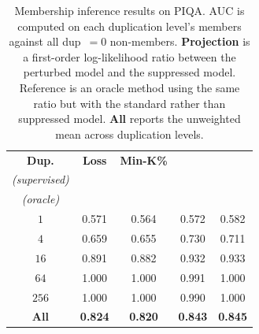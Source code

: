 \begin{table}[h]
    \centering
    \small
    \setlength{\tabcolsep}{5pt}
    \renewcommand{\arraystretch}{1.12}
    \caption{
        Membership inference results on PIQA. AUC is computed on each duplication level's members against all dup~$=0$ non-members. \textbf{Projection} is a first-order log-likelihood ratio between the perturbed model and the suppressed model. Reference is an oracle method using the same ratio but with the standard rather than suppressed model. \textbf{All} reports the unweighted mean across duplication levels.
    }
    \vspace{2pt}
    \begin{tabular}{@{}c c c c c@{}}
        \toprule
        \textbf{Dup.}
        & \textbf{Loss}
        & \textbf{Min-K\%}
        & \shortstack{\textbf{Projection}\\\textit{(supervised)}}
        & \cellcolor{gray!18}
          \shortstack{\textbf{Reference}\\\textit{(oracle)}} \\
        \midrule

        $1$
        & 0.571
        & 0.564
        & 0.572
        & \cellcolor{gray!18} 0.582 \\

        $4$
        & 0.659
        & 0.655
        & 0.730
        & \cellcolor{gray!18} 0.711 \\

        $16$
        & 0.891
        & 0.882
        & 0.932
        & \cellcolor{gray!18} 0.933 \\

        $64$
        & 1.000
        & 1.000
        & 0.991
        & \cellcolor{gray!18} 1.000 \\

        $256$
        & 1.000
        & 1.000
        & 0.990
        & \cellcolor{gray!18} 1.000 \\

        \midrule

        \textbf{All}
        & \textbf{0.824}
        & \textbf{0.820}
        & \textbf{0.843}
        & \cellcolor{gray!18} \textbf{0.845} \\

        \bottomrule
    \end{tabular}
    \label{tab:piqa-mia}
\end{table}
